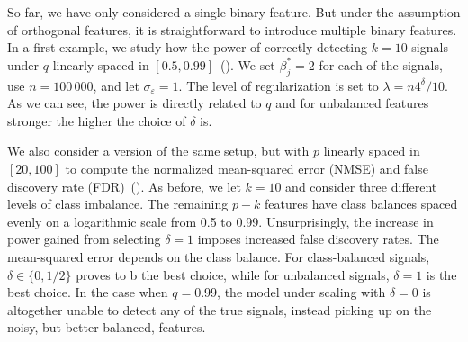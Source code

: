 So far, we have only considered a single binary feature. But under the assumption of orthogonal features, it is straightforward to introduce multiple binary features. In a first example, we study how the power of correctly detecting \(k=10\) signals under \(q\) linearly spaced in \([0.5, 0.99]\)~(). We set \(\beta^*_j = 2\) for each of the signals, use \(n = 100\,000\), and let \(\sigma_\varepsilon = 1\). The level of regularization is set to \(\lambda = n 4^\delta/10\). As we can see, the power is directly related to \(q\) and for unbalanced features stronger the higher the choice of \(\delta\) is.

We also consider a version of the same setup, but with \(p\) linearly spaced in \([20, 100]\) to compute the normalized mean-squared error (NMSE) and false discovery rate (FDR)~(). As before, we let \(k = 10\) and consider three different levels of class imbalance. The remaining \(p-k\) features have class balances spaced evenly on a logarithmic scale from 0.5 to 0.99. Unsurprisingly, the increase in power gained from selecting \(\delta = 1\) imposes increased false discovery rates. The mean-squared error depends on the class balance. For class-balanced signals, \(\delta \in \{0, 1/2\}\) proves to b the best choice, while for unbalanced signals, \(\delta = 1\) is the best choice. In the case when \(q = 0.99\), the model under scaling with \(\delta = 0\) is altogether unable to detect any of the true signals, instead picking up on the noisy, but better-balanced, features.

